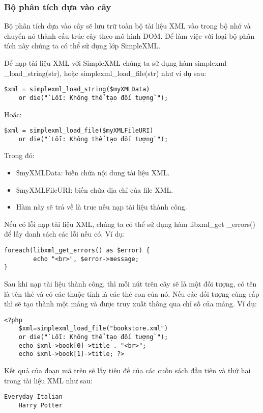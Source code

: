 \subsubsection{Bộ phân tích dựa vào cây}
Bộ phân tích dựa vào cây sẽ lưu trữ toàn bộ tài liệu XML vào trong bộ nhớ và chuyển nó thành cấu trúc cây theo mô hình DOM. Để làm việc với loại bộ phân tích này chúng ta có thể sử dụng lớp SimpleXML.

Để nạp tài liệu XML với SimpleXML chúng ta sử dụng hàm {\ttfamily simplexml \_load\_string(str)}, hoặc {\ttfamily simplexml\_load\_file(str)} như ví dụ sau:
\lstset{language=XML}
\begin{lstlisting}[escapechar=`]
	$xml = simplexml_load_string($myXMLData) 
	or die("`Lỗi: Không thể tạo đối tượng`");
\end{lstlisting}
Hoặc:
\lstset{language=XML}
\begin{lstlisting}[escapechar=`]
	$xml = simplexml_load_file($myXMLFileURI) 
	or die("`Lỗi: Không thể tạo đối tượng`");
\end{lstlisting}

Trong đó:
\begin{itemize}
\item	{\ttfamily \$myXMLData}: biến chứa nội dung tài liệu XML.
\item	{\ttfamily \$myXMLFileURI}: biến chứa địa chỉ của file XML.
\item	Hàm này sẽ trả về là true nếu nạp tài liệu thành công.
\end{itemize}
Nếu có lỗi nạp tài liệu XML, chúng ta có thể sử dụng hàm {\ttfamily libxml\_get \_errors()} để lấy danh sách các lỗi nếu có. Ví dụ:
\lstset{language=XML}
\begin{lstlisting}[escapechar=`]
	foreach(libxml_get_errors() as $error) {
		echo "<br>", $error->message;
}
\end{lstlisting}

Sau khi nạp tài liệu thành công, thì mỗi nút trên cây sẽ là một đối tượng, có tên là tên thẻ và có các thuộc tính là các thẻ con của nó. Nếu các đối tượng cùng cấp thì sẽ tạo thành một mảng và được truy xuất thông qua chỉ số của mảng. Ví dụ:
\lstset{language=XML}
\begin{lstlisting}[escapechar=`]
	<?php
	$xml=simplexml_load_file("bookstore.xml") 
	or die("`Lỗi: Không thể tạo đối tượng`");
	echo $xml->book[0]->title . "<br>";
	echo $xml->book[1]->title; ?>
\end{lstlisting}

Kết quả của đoạn mã trên sẽ lấy tiêu đề của các cuốn sách đầu tiên và thứ hai trong tài liệu XML như sau:
\lstset{language=XML}
\begin{lstlisting}[escapechar=`]
	Everyday Italian
	Harry Potter
\end{lstlisting}

